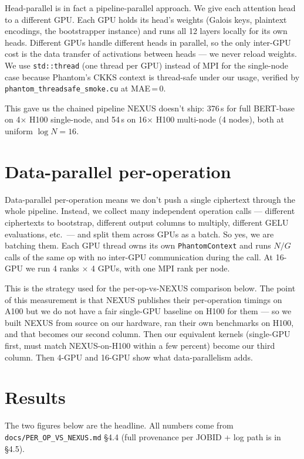 \documentclass[11pt,a4paper]{article}
\begin{document}
Head-parallel is in fact a pipeline-parallel approach. We give each attention head to a different GPU. Each GPU holds its head's weights (Galois keys, plaintext encodings, the bootstrapper instance) and runs all 12 layers locally for its own heads. Different GPUs handle different heads in parallel, so the only inter-GPU cost is the data transfer of activations between heads --- we never reload weights. We use \texttt{std::thread} (one thread per GPU) instead of MPI for the single-node case because Phantom's CKKS context is thread-safe under our usage, verified by \texttt{phantom\_threadsafe\_smoke.cu} at MAE\,=\,0.

This gave us the chained pipeline NEXUS doesn't ship: 376\,s for full BERT-base on 4$\times$ H100 single-node, and 54\,s on 16$\times$ H100 multi-node (4 nodes), both at uniform $\log N=16$.

\section*{Data-parallel per-operation}

Data-parallel per-operation means we don't push a single ciphertext through the whole pipeline. Instead, we collect many independent operation calls --- different ciphertexts to bootstrap, different output columns to multiply, different GELU evaluations, etc.\ --- and split them across GPUs as a batch. So yes, we are batching them. Each GPU thread owns its own \texttt{PhantomContext} and runs $N/G$ calls of the same op with no inter-GPU communication during the call. At 16-GPU we run 4 ranks $\times$ 4 GPUs, with one MPI rank per node.

This is the strategy used for the per-op-vs-NEXUS comparison below. The point of this measurement is that NEXUS publishes their per-operation timings on A100 but we do not have a fair single-GPU baseline on H100 for them --- so we built NEXUS from source on our hardware, ran their own benchmarks on H100, and that becomes our second column. Then our equivalent kernels (single-GPU first, must match NEXUS-on-H100 within a few percent) become our third column. Then 4-GPU and 16-GPU show what data-parallelism adds.

\section*{Results}

The two figures below are the headline. All numbers come from \texttt{docs/PER\_OP\_VS\_NEXUS.md} \S4.4 (full provenance per JOBID + log path is in \S4.5).
\end{document}
